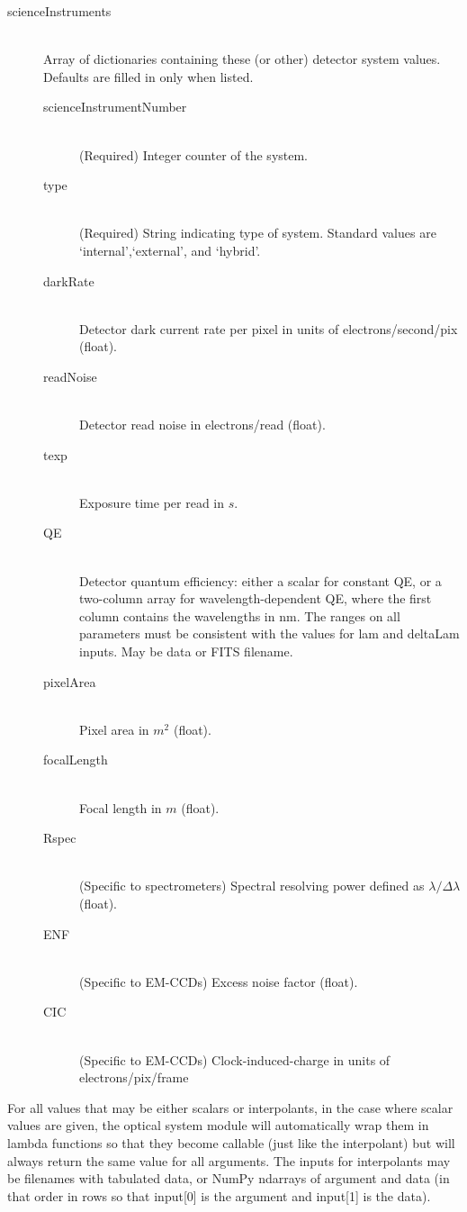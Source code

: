 \documentclass[cleanfoot]{asme2ej}
\begin{document}
\begin{description}
    \item[scienceInstruments] \hfill\\ Array of dictionaries containing these (or other) detector system values.  Defaults are filled in only when listed.
    \begin{description}
    \item[scienceInstrumentNumber] \hfill\\ (Required) Integer counter of the system.
    \item[type] \hfill\\ (Required) String indicating type of system.  Standard values are `internal',`external', and `hybrid'.
    \item[darkRate] \hfill \\
    Detector dark current rate per pixel in units of electrons/second/pix (float). 
    \item[readNoise] \hfill \\
    Detector read noise in electrons/read (float). 
    \item[texp] \hfill \\
    Exposure time per read in $ s $. 
    \item[QE] \hfill \\
    Detector quantum efficiency: either a scalar for constant QE, or a two-column array for wavelength-dependent QE, where the first column contains the wavelengths in nm. The ranges on all parameters must be consistent with the values for lam and deltaLam inputs. May be data or FITS filename. 
    \item[pixelArea] \hfill \\
    Pixel area in $ m^2 $ (float). 
    \item[focalLength] \hfill \\
    Focal length in $ m $ (float). 
    \item[Rspec] \hfill \\
    (Specific to spectrometers) Spectral resolving power defined as $\lambda/\Delta\lambda$ (float). 
    \item[ENF] \hfill \\
    (Specific to EM-CCDs) Excess noise factor (float).
    \item[CIC] \hfill \\
    (Specific to EM-CCDs) Clock-induced-charge in units of electrons/pix/frame
    \end{description}
\end{description}


For all values that may be either scalars or interpolants, in the case where scalar values are given, the optical system module will automatically wrap them in lambda functions so that they become callable (just like the interpolant) but will always return the same value for all arguments.  The inputs for interpolants may be filenames with tabulated data, or NumPy ndarrays of argument and data (in that order in rows so that input[0] is the argument and input[1] is the data).
\end{document}
